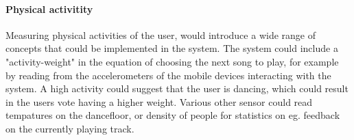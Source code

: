 \paragraph{Physical activitity}
Measuring physical activities of the user, would introduce a wide range of concepts that could be implemented in the system. The system could include a "activity-weight" in the equation of choosing the next song to play, for example by reading from the accelerometers of the mobile devices interacting with the system. A high activity could suggest that the user is dancing, which could result in the users vote having a higher weight. Various other sensor could read tempatures on the dancefloor, or density of people for statistics on eg. feedback on the currently playing track.
